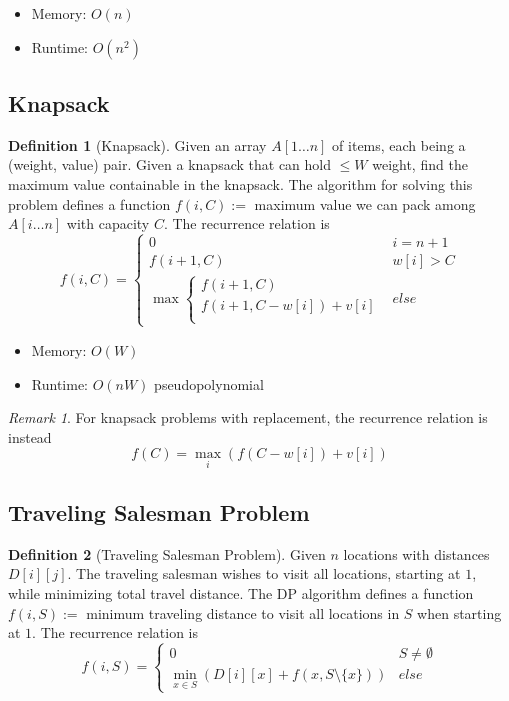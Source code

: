 \documentclass[11pt]{article}
\theoremstyle{definition}
\newtheorem{definition}{Definition}[section]
\theoremstyle{remark}
\newtheorem*{remark}{Remark}
\begin{document}
\begin{itemize}
\item Memory: $O(n)$
\item Runtime: $O(n^2)$
\end{itemize}

\subsection{Knapsack}
\begin{definition}[Knapsack]
Given an array $A[1\dots n]$ of items, each being a (weight, value) pair. Given a knapsack that can hold $\leq W$ weight, find the maximum value containable in the knapsack. The algorithm for solving this problem defines a function $f(i, C) := $ maximum value we can pack among $A[i\dots n]$ with capacity $C$. The recurrence relation is
\[
f(i,C) = \begin{cases}
0 & i = n+1 \\
f(i+1, C) & w[i] > C \\
\max \begin{cases}
f(i+1, C) \\
f(i+1, C - w[i]) + v[i] \\
\end{cases} & else
\end{cases}
\]
\end{definition}

\begin{itemize}
\item Memory: $O(W)$
\item Runtime: $O(nW)$ \qquad *pseudopolynomial
\end{itemize}

\begin{remark}
For knapsack problems with replacement, the recurrence relation is instead
\[
f(C) = \max_{i} \left(f(C - w[i]) + v[i]\right)
\]
\end{remark}

\subsection{Traveling Salesman Problem}
\begin{definition}[Traveling Salesman Problem]
Given $n$ locations with distances $D[i][j]$. The traveling salesman wishes to visit all locations, starting at $1$, while minimizing total travel distance. The DP algorithm defines a function $f(i,S) :=$ minimum traveling distance to visit all locations in $S$ when starting at $1$. The recurrence relation is
\[
f(i,S) = \begin{cases}
0 & S\neq \emptyset \\
\min_{x\in S} \left(D[i][x]+f\left(x, S \setminus \{x\}\right)\right) & else
\end{cases}
\]
\end{definition}
\end{document}
